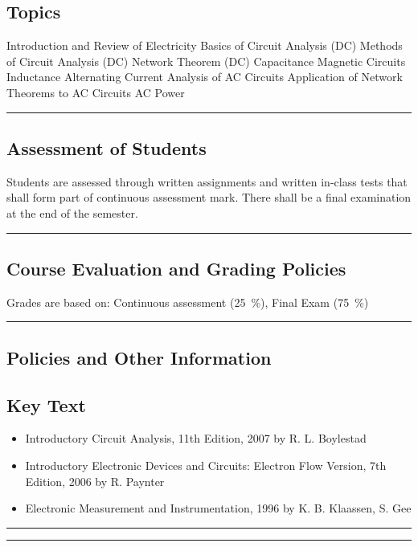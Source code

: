 \subsection*{Topics}
\begin{outline}
    \1 Introduction and Review of Electricity
    \1 Basics of Circuit Analysis (DC)
    \1 Methods of Circuit Analysis (DC)
    \1 Network Theorem (DC)
    \1 Capacitance
    \1 Magnetic Circuits
    \1 Inductance
    \1 Alternating Current
    \1 Analysis of AC Circuits
    \1 Application of Network Theorems to AC Circuits
    \1 AC Power
\end{outline}
\vspace{2ex} \hrule\vspace{2ex}

\subsection*{Assessment of Students}
\begin{outline}
    \1 Students are assessed through written assignments and written in-class tests that shall form part of continuous assessment mark.
    \1 There shall be a final examination at the end of the semester.
\end{outline}
\vspace{2ex}\hrule\vspace{2ex}

\subsection*{Course Evaluation and Grading Policies}
Grades are based on:
Continuous assessment (\qty{25}{\percent}),
Final Exam (\qty{75}{\percent})
\vspace{2ex}\hrule\vspace{2ex}

\subsection*{Policies and Other Information}
\subsection*{Key Text}
\begin{itemize}
    \item Introductory Circuit Analysis, 11th Edition, 2007 by R. L. Boylestad
    \item Introductory Electronic Devices and Circuits: Electron Flow Version, 7th Edition, 2006 by R. Paynter
    \item Electronic Measurement and Instrumentation, 1996 by K. B. Klaassen, S. Gee
\end{itemize}
\vspace{2ex}\hrule
\vspace{2ex}\hrule\vspace{2ex}